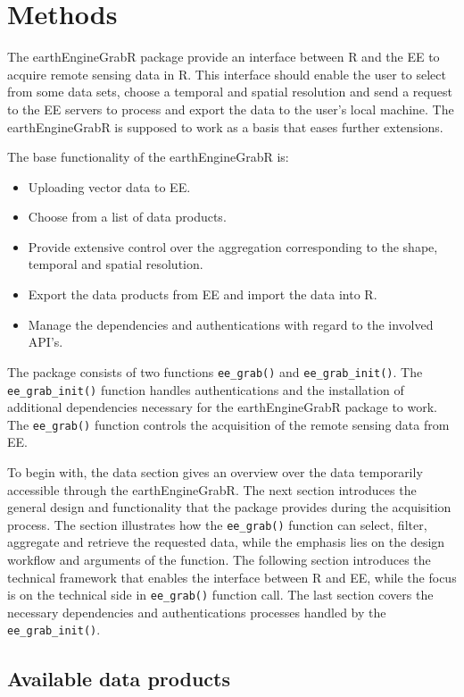 \chapter{Methods}

The earthEngineGrabR package provide an interface between R and the EE to acquire remote sensing data in R. This interface should enable the user to select from some data sets, choose a temporal and spatial resolution and send a request to the EE servers to process and export the data to the user's local machine. The earthEngineGrabR is supposed to work as a basis that eases further extensions.

The base functionality of the earthEngineGrabR is: 
\begin{itemize}
	\item Uploading vector data to EE.
	\item Choose from a list of data products.
	\item Provide extensive control over the aggregation corresponding to the shape, temporal and spatial resolution.
	\item Export the data products from EE and import the data into R.
	\item Manage the dependencies and authentications with regard to the involved API's.
\end{itemize}

The package consists of two functions \mbox{\texttt{ee\_grab()}} and \mbox{\texttt{ee\_grab\_init()}}. The \texttt{ee\_grab\_init()} function handles authentications and the installation of additional dependencies necessary for the earthEngineGrabR package to work. The \texttt{ee\_grab()} function controls the acquisition of the remote sensing data from EE.

To begin with, the data section gives an overview over the data temporarily accessible through the earthEngineGrabR. 
The next section introduces the general design and functionality that the package provides during the acquisition process. The section illustrates how the \texttt{ee\_grab()} function can select, filter, aggregate and retrieve the requested data, while the emphasis lies on the design workflow and arguments of the function.
The following section introduces the technical framework that enables the interface between R and EE, while the focus is on the technical side in \texttt{ee\_grab()} function call.
The last section covers the necessary dependencies and authentications processes handled by the \texttt{ee\_grab\_init()}.

\section{Available data products}

